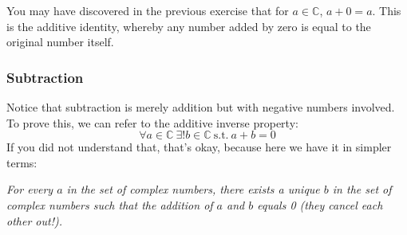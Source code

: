 \documentclass[a4paper]{article}
\theoremstyle{plain}
\theoremstyle{definition}
\theoremstyle{remark}
\begin{document}
        You may have discovered in the previous exercise that for $a\in \mathbb{C}$, $a+0=a$. This is the additive identity, whereby any number added by zero is equal to the original number itself. 

        \subsubsection{Subtraction}
        Notice that subtraction is merely addition but with negative numbers involved. To prove this, we can refer to the additive inverse property:
        $$\forall a \in \mathbb{C} \ \exists !b \in \mathbb{C} \ \mathrm{s.t.} \ a+b=0$$
        If you did not understand that, that's okay, because here we have it in simpler terms:
        \begin{center}
            \textit{For every $a$ in the set of complex numbers, there exists a unique $b$ in the set of complex numbers such that the addition of $a$ and $b$ equals 0 (they cancel each other out!).}
        \end{center}
\end{document}
